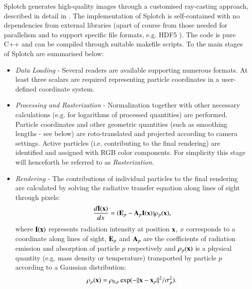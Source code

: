 \documentclass[1p]{elsarticle}
\begin{document}
Splotch generates high-quality images through a customised ray-casting approach, described in detail in \cite{2008NJPh...10l5006D}.  
The implementation of Splotch is self-contained with no dependencies from external libraries (apart of course from those needed for parallelism and to support specific file formats, e.g. HDF5 \cite{hdf5}). The code is pure C++ and can be compiled through suitable makefile scripts.
To the main stages of Splotch are summarised below:
\begin{itemize}
\item
{\it Data Loading} - Several readers are available supporting numerous formats. At least three scalars are required representing particle coordinates in a user-defined coordinate system.
\item
{\it Processing and Rasterization} - Normalization together with other necessary 
calculations (e.g. for logarithms of processed quantities) are performed. Particle
coordinates and other geometric quantities (such as smoothing lengths - see below) are
roto-translated and projected according to camera settings.
Active particles (i.e. contributing to the final rendering) are identified and assigned with RGB color components. For simplicity this stage will henceforth be referred to as {\it Rasterization}.
\item
{\it Rendering} - The contributions of individual particles to the final rendering are calculated by solving the radiative transfer equation  \cite{1991par..book.....S} along lines of sight through pixels:
\begin{equation}\label{rad}
\frac{d{\bf I}{(\bf x})}{dx}=({\bf E}_p-{\bf A}_p{\bf I}({\bf x}))\rho_p({\bf x}),
\end{equation}
where ${\bf I}({\bf x})$ represents radiation intensity at position ${\bf x}$, $x$ corresponds to a coordinate along lines of sight,  ${\bf E}_p$ and ${\bf A}_p$ are the coefficients of radiation emission and absorption of particle $p$ respectively and $\rho_p({\bf x})$ is a physical quantity (e.g. mass density or temperature) transported by particle $p$ according to a Gaussian distribution:
\begin{equation}\label{kernel}
\rho_p({\bf x}) = \rho_{0,p}\exp(-{||{\bf x}-{\bf x}_p||}^2/\sigma_p^2).
\end{equation}
 

\end{itemize}
\end{document}
